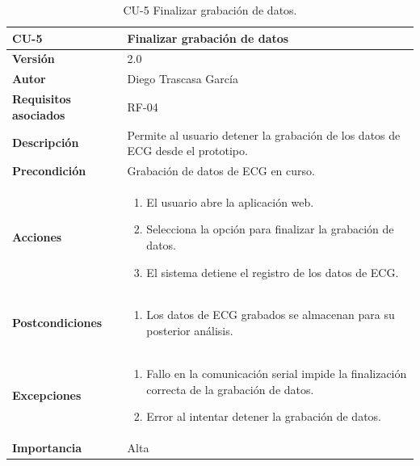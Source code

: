 \begin{table}[p]
	\centering
	\begin{tabularx}{\linewidth}{ p{} p{} }
		\toprule
		\textbf{CU-5}    & \textbf{Finalizar grabación de datos}\\
		\toprule
		\textbf{Versión}              & 2.0    \\
		\textbf{Autor}                & Diego Trascasa García \\
		\textbf{Requisitos asociados} & RF-04 \\
		\textbf{Descripción}          & Permite al usuario detener la grabación de los datos de ECG desde el prototipo. \\
		\textbf{Precondición}         & Grabación de datos de ECG en curso. \\
		\textbf{Acciones}             &
		\begin{enumerate}
			\item El usuario abre la aplicación web.
			\item Selecciona la opción para finalizar la grabación de datos.
			\item El sistema detiene el registro de los datos de ECG.
		\end{enumerate}\\
		\textbf{Postcondiciones}      & 
		\begin{enumerate}
			\item Los datos de ECG grabados se almacenan para su posterior análisis.
		\end{enumerate}\\
		\textbf{Excepciones}          & 
		\begin{enumerate}
			\item Fallo en la comunicación serial impide la finalización correcta de la grabación de datos.
			\item Error al intentar detener la grabación de datos.
		\end{enumerate}\\
		\textbf{Importancia}          & Alta \\
		\bottomrule
	\end{tabularx}
	\caption{CU-5 Finalizar grabación de datos.}
    \label{CU-5}
\end{table}

